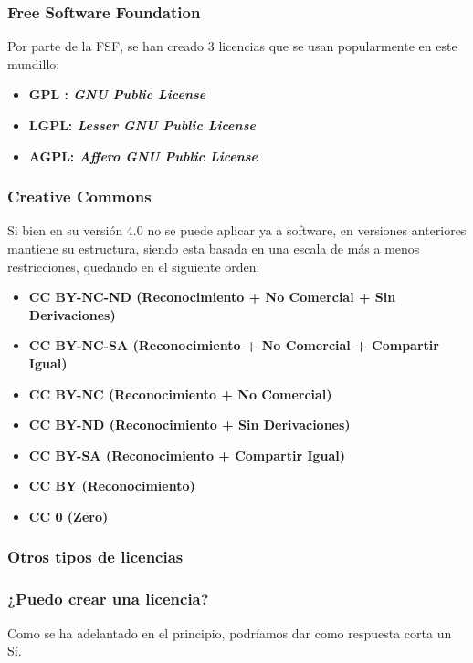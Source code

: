 \subsubsection{Free Software Foundation}
Por parte de la FSF, se han creado 3 licencias que se usan popularmente en este mundillo:

\begin{itemize}
	\item \textbf{GPL : \textit{GNU Public License}}
	\item \textbf{LGPL: \textit{Lesser GNU Public License}}
	\item \textbf{AGPL: \textit{Affero GNU Public License}}
\end{itemize}

\subsubsection{Creative Commons}

Si bien en su versión 4.0 no se puede aplicar ya a software, en versiones anteriores mantiene su estructura, siendo esta basada en una escala de más a menos restricciones, quedando en el siguiente orden:

\begin{itemize}
	\item \textbf{CC BY-NC-ND (Reconocimiento + No Comercial + Sin Derivaciones)}
	\item \textbf{CC BY-NC-SA (Reconocimiento + No Comercial + Compartir Igual)}
	\item \textbf{CC BY-NC (Reconocimiento + No Comercial)}
	\item \textbf{CC BY-ND (Reconocimiento + Sin Derivaciones)}
	\item \textbf{CC BY-SA (Reconocimiento + Compartir Igual)}
	\item \textbf{CC BY (Reconocimiento)}
	\item \textbf{CC 0 (Zero)}
\end{itemize}

\subsubsection{Otros tipos de licencias}

\subsubsection{¿Puedo crear una licencia?}
Como se ha adelantado en el principio, podríamos dar como respuesta corta un Sí.